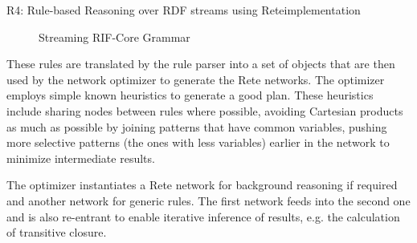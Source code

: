 \begin{nestedsection}{R4: Rule-based Reasoning over RDF streams using Rete}{implementation}
\begin{figure}
\begin{ebnf}
\end{ebnf}
\caption{Streaming RIF-Core Grammar}
\label{lst-S-RIF-Core}
\end{figure}

	These rules are translated by the rule parser into a set of objects that are then used by the network optimizer to generate the Rete networks.
	The optimizer employs simple known heuristics to generate a good plan.
	These heuristics include sharing nodes between rules where possible, avoiding Cartesian products as much as possible by joining patterns that have common variables, pushing more selective patterns (the ones with less variables) earlier in the network to minimize intermediate results.
	
	The optimizer instantiates a Rete network for background reasoning if required and another network for generic rules.
	The first network feeds into the second one and is also re-entrant to enable iterative inference of results, e.g. the calculation of transitive closure.
	

\end{nestedsection}
